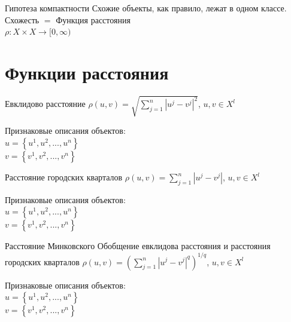 \documentclass[10pt]{beamer}
\begin{document}
\begin{frame}{Гипотеза компактности}
	Схожие объекты, как правило, лежат в одном классе.\\
	\bigbreak
	\alert{Схожесть} $=$ Функция расстояния\\
	\bigbreak
	${\rho: X \times X \rightarrow [0, \infty) }$
\end{frame}

\section{Функции расстояния}

{
\begin{frame}{Евклидово расстояние}
	${\rho (u, v) = \sqrt{\sum\limits_{j=1}^n |u^j - v^j|^2}}$, \hspace{5mm} ${u, v \in X^{l}}$\\
	\bigbreak
	
	Признаковые описания объектов:\\
	${u = \left\{ u^1, u^2, ..., u^n \right\}}$ \\
	${v = \left\{v^1, v^2, ..., v^n \right\} }$ 
\end{frame}
}

{
\begin{frame}{Расстояние городских кварталов}
	${\rho (u, v) = \sum\limits_{j=1}^n |u^j - v^j|}$, \hspace{5mm} ${u, v \in X^{l}}$\\
	\bigbreak
	
	Признаковые описания объектов:\\
	${u = \left\{ u^1, u^2, ..., u^n \right\}}$ \\
	${v = \left\{v^1, v^2, ..., v^n \right\} }$ 
\end{frame}
}

{
\begin{frame}{Расстояние Минковского}
	Обобщение евклидова расстояния и расстояния городских кварталов
	\bigbreak
	${\rho (u, v) = (\sum\limits_{j=1}^n |u^j - v^j|^q)^{1/q}}$, \hspace{5mm} ${u, v \in X^{l}}$\\
	\bigbreak
	
	Признаковые описания объектов:\\
	${u = \left\{ u^1, u^2, ..., u^n \right\}}$ \\
	${v = \left\{v^1, v^2, ..., v^n \right\} }$ 
\end{frame}
}
\end{document}
